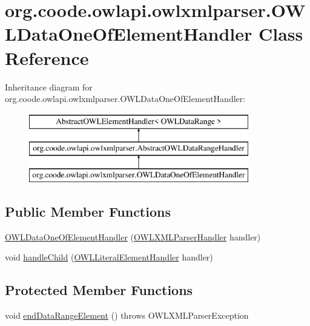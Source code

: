 \hypertarget{classorg_1_1coode_1_1owlapi_1_1owlxmlparser_1_1_o_w_l_data_one_of_element_handler}{\section{org.\-coode.\-owlapi.\-owlxmlparser.\-O\-W\-L\-Data\-One\-Of\-Element\-Handler Class Reference}
\label{classorg_1_1coode_1_1owlapi_1_1owlxmlparser_1_1_o_w_l_data_one_of_element_handler}
}
Inheritance diagram for org.\-coode.\-owlapi.\-owlxmlparser.\-O\-W\-L\-Data\-One\-Of\-Element\-Handler\-:\begin{figure}[H]
\begin{center}
\leavevmode
\includegraphics[height=3.000000cm]{classorg_1_1coode_1_1owlapi_1_1owlxmlparser_1_1_o_w_l_data_one_of_element_handler}
\end{center}
\end{figure}
\subsection*{Public Member Functions}
\begin{DoxyCompactItemize}
\item 
\hyperlink{classorg_1_1coode_1_1owlapi_1_1owlxmlparser_1_1_o_w_l_data_one_of_element_handler_a9799e1c2421de1e28c39dca8f940986c}{O\-W\-L\-Data\-One\-Of\-Element\-Handler} (\hyperlink{classorg_1_1coode_1_1owlapi_1_1owlxmlparser_1_1_o_w_l_x_m_l_parser_handler}{O\-W\-L\-X\-M\-L\-Parser\-Handler} handler)
\item 
void \hyperlink{classorg_1_1coode_1_1owlapi_1_1owlxmlparser_1_1_o_w_l_data_one_of_element_handler_ab615203254fda0c0a1ad85a6665735a4}{handle\-Child} (\hyperlink{classorg_1_1coode_1_1owlapi_1_1owlxmlparser_1_1_o_w_l_literal_element_handler}{O\-W\-L\-Literal\-Element\-Handler} handler)
\end{DoxyCompactItemize}
\subsection*{Protected Member Functions}
\begin{DoxyCompactItemize}
\item 
void \hyperlink{classorg_1_1coode_1_1owlapi_1_1owlxmlparser_1_1_o_w_l_data_one_of_element_handler_ae5dce1176a4cc5ac740f9b14b2594d21}{end\-Data\-Range\-Element} ()  throws O\-W\-L\-X\-M\-L\-Parser\-Exception 
\end{DoxyCompactItemize}


